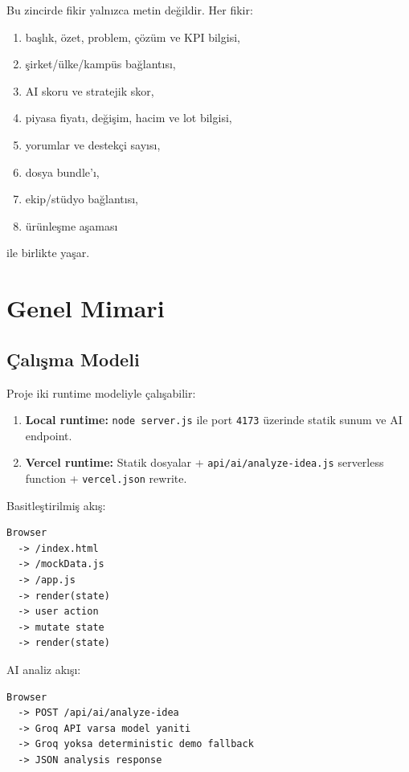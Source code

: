 \documentclass[11pt,a4paper]{article}
\newcommand{\code}[1]{\texttt{#1}}
\begin{document}
Bu zincirde fikir yalnızca metin değildir. Her fikir:

\begin{enumerate}
  \item başlık, özet, problem, çözüm ve KPI bilgisi,
  \item şirket/ülke/kampüs bağlantısı,
  \item AI skoru ve stratejik skor,
  \item piyasa fiyatı, değişim, hacim ve lot bilgisi,
  \item yorumlar ve destekçi sayısı,
  \item dosya bundle'ı,
  \item ekip/stüdyo bağlantısı,
  \item ürünleşme aşaması
\end{enumerate}

ile birlikte yaşar.

\section{Genel Mimari}

\subsection{Çalışma Modeli}

Proje iki runtime modeliyle çalışabilir:

\begin{enumerate}
  \item \textbf{Local runtime:} \code{node server.js} ile port \code{4173} üzerinde statik sunum ve AI endpoint.
  \item \textbf{Vercel runtime:} Statik dosyalar + \code{api/ai/analyze-idea.js} serverless function + \code{vercel.json} rewrite.
\end{enumerate}

Basitleştirilmiş akış:

\begin{lstlisting}
Browser
  -> /index.html
  -> /mockData.js
  -> /app.js
  -> render(state)
  -> user action
  -> mutate state
  -> render(state)
\end{lstlisting}

AI analiz akışı:

\begin{lstlisting}
Browser
  -> POST /api/ai/analyze-idea
  -> Groq API varsa model yaniti
  -> Groq yoksa deterministic demo fallback
  -> JSON analysis response
\end{lstlisting}
\end{document}
